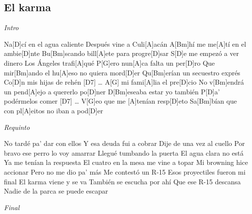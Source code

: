 \subsection{El karma}
\noindent

\vspace{1cm}

\begin{guitar}
	\begin{multicols}{2}
		\textit{Intro}
		\par
		Na[D]cí en el agua caliente
		Después vine a Culi[A]acán
		A[Bm]hí me me[A]tí en el ambie[D]nte
		Bu[Bm]scando bill[A]ete para progre[D]sar
		S[D]e me empezó a ver dinero
		Los Ángeles trafi[A]qué
		P[G]ero nun[A]ca falta un per[D]ro
		Que mir[Bm]ando el hu[A]eso no quiera mord[D]er
		Qu[Bm]erían un secuestro exprés
		Co[D]n mis hijas de rehén [D7] \dots
		A[G] mi fami[A]lia el pre[D]cio
		No v[Bm]endrá un pend[A]ejo a quererlo po[D]ner
		D[Bm]eseaba estar yo también
		P[D]a' podérmelos comer [D7] \dots
		V[G]eo que me [A]tenían resp[D]eto
		Sa[Bm]bían que con pl[A]eitos no iban a pod[D]er
	\par
	\textit{Requinto}
	\par

	No tardé pa' dar con ellos
	Y esa deuda fui a cobrar
	Dije de una vez al cuello
	Por bravo ese perro lo voy amarrar
	Llegué tumbando la puerta
	El agua clara no está
	Ya me tenían la respuesta
	El cuatro en la mesa me vine a topar
	Mi browning hice accionar
	Pero no me dio pa' más
	Me contestó un R-15
	Esos proyectiles fueron mi final
	El karma viene y se va
	También se escucha por ahí
	Que ese R-15 descansa
	Nadie de la parca se puede escapar
	\par
		\textit{Final}
	\end{multicols}
\end{guitar}
